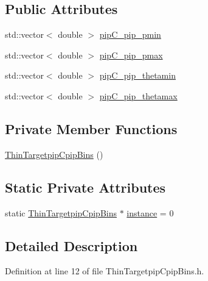 \subsection*{Public Attributes}
\begin{DoxyCompactItemize}
\item 
std\-::vector$<$ double $>$ \hyperlink{class_neutrino_flux_reweight_1_1_thin_targetpip_cpip_bins_a874e14ecf5a53ec934fbb5f9ed813592}{pip\-C\-\_\-pip\-\_\-pmin}
\item 
std\-::vector$<$ double $>$ \hyperlink{class_neutrino_flux_reweight_1_1_thin_targetpip_cpip_bins_a6f8aa4a79f5c0aa512633d84ab822ac2}{pip\-C\-\_\-pip\-\_\-pmax}
\item 
std\-::vector$<$ double $>$ \hyperlink{class_neutrino_flux_reweight_1_1_thin_targetpip_cpip_bins_ab77cf82bfaa42b9b08dae91f4f1a0a0d}{pip\-C\-\_\-pip\-\_\-thetamin}
\item 
std\-::vector$<$ double $>$ \hyperlink{class_neutrino_flux_reweight_1_1_thin_targetpip_cpip_bins_aa6811f55516db221df561b1fe1bfd6f0}{pip\-C\-\_\-pip\-\_\-thetamax}
\end{DoxyCompactItemize}
\subsection*{Private Member Functions}
\begin{DoxyCompactItemize}
\item 
\hyperlink{class_neutrino_flux_reweight_1_1_thin_targetpip_cpip_bins_a79ee5f6084643a57f3c7bb1f40d0f344}{Thin\-Targetpip\-Cpip\-Bins} ()
\end{DoxyCompactItemize}
\subsection*{Static Private Attributes}
\begin{DoxyCompactItemize}
\item 
static \hyperlink{class_neutrino_flux_reweight_1_1_thin_targetpip_cpip_bins}{Thin\-Targetpip\-Cpip\-Bins} $\ast$ \hyperlink{class_neutrino_flux_reweight_1_1_thin_targetpip_cpip_bins_adde6da04efd43d2fe69c4adfb0c33008}{instance} = 0
\end{DoxyCompactItemize}


\subsection{Detailed Description}


Definition at line 12 of file Thin\-Targetpip\-Cpip\-Bins.\-h.



